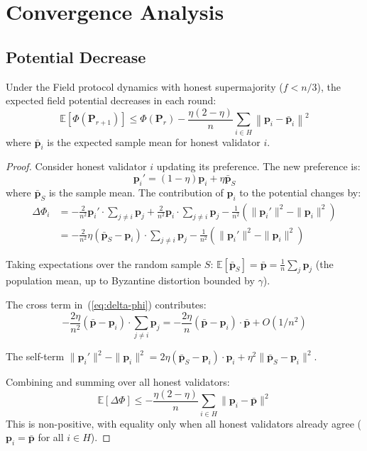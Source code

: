 \section{Convergence Analysis}

\label{sec:potential}

\subsection{Potential Decrease}

\begin{theorem}
\label{thm:potential}
Under the Field protocol dynamics with honest supermajority ($f < n/3$), the expected
field potential decreases in each round:
\[
\mathbb{E}[\Phi(\mathbf{P}_{r+1})] \leq \Phi(\mathbf{P}_r) - \frac{\eta(2-\eta)}{n} \sum_{i \in H} \left\| \mathbf{p}_i - \bar{\mathbf{p}}_i \right\|^2
\]
where $\bar{\mathbf{p}}_i$ is the expected sample mean for honest validator $i$.
\end{theorem}

\begin{proof}
Consider honest validator $i$ updating its preference. The new preference is:
\[
\mathbf{p}_i' = (1 - \eta)\mathbf{p}_i + \eta \bar{\mathbf{p}}_S
\]
where $\bar{\mathbf{p}}_S$ is the sample mean. The contribution of $\mathbf{p}_i$ to the
potential changes by:
\begin{align}
\Delta \Phi_i &= -\frac{2}{n^2} \mathbf{p}_i' \cdot \sum_{j \neq i} \mathbf{p}_j + \frac{2}{n^2} \mathbf{p}_i \cdot \sum_{j \neq i} \mathbf{p}_j - \frac{1}{n^2}(\|\mathbf{p}_i'\|^2 - \|\mathbf{p}_i\|^2) \nonumber \\
&= -\frac{2}{n^2} \eta(\bar{\mathbf{p}}_S - \mathbf{p}_i) \cdot \sum_{j \neq i} \mathbf{p}_j - \frac{1}{n^2}(\|\mathbf{p}_i'\|^2 - \|\mathbf{p}_i\|^2) \label{eq:delta-phi}
\end{align}

Taking expectations over the random sample $S$:
$\mathbb{E}[\bar{\mathbf{p}}_S] = \bar{\mathbf{p}} = \frac{1}{n}\sum_{j} \mathbf{p}_j$
(the population mean, up to Byzantine distortion bounded by $\gamma$).

The cross term in~(\ref{eq:delta-phi}) contributes:
\[
-\frac{2\eta}{n^2} (\bar{\mathbf{p}} - \mathbf{p}_i) \cdot \sum_{j \neq i} \mathbf{p}_j
= -\frac{2\eta}{n} (\bar{\mathbf{p}} - \mathbf{p}_i) \cdot \bar{\mathbf{p}} + O(1/n^2)
\]

The self-term $\|\mathbf{p}_i'\|^2 - \|\mathbf{p}_i\|^2 = 2\eta(\bar{\mathbf{p}}_S - \mathbf{p}_i) \cdot \mathbf{p}_i + \eta^2\|\bar{\mathbf{p}}_S - \mathbf{p}_i\|^2$.

Combining and summing over all honest validators:
\[
\mathbb{E}[\Delta \Phi] \leq -\frac{\eta(2-\eta)}{n} \sum_{i \in H} \|\mathbf{p}_i - \bar{\mathbf{p}}\|^2
\]
This is non-positive, with equality only when all honest validators already agree
($\mathbf{p}_i = \bar{\mathbf{p}}$ for all $i \in H$).
\end{proof}

